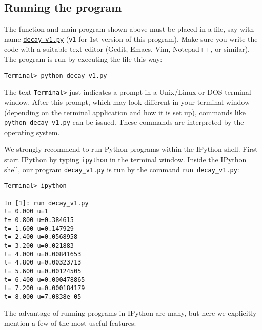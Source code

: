 \documentclass[graybox,sectrefs,envcountresetchap,open=right,final]{svmonodo}
\begin{document}
\subsection{Running the program}

The function and main program shown above must be placed in a file,
say with name \href{{http://tinyurl.com/ofkw6kc/alg/decay_v1.py}}{\nolinkurl{decay_v1.py}} (\texttt{v1} for 1st version of this program).  Make sure you
write the code with a suitable text editor (Gedit, Emacs, Vim,
Notepad++, or similar).  The program is run by executing the file this
way:



\begin{Verbatim}[frame=lines,label=\fbox{{\tiny Terminal}},framesep=2.5mm,framerule=0.7pt,fontsize=\fontsize{9pt}{9pt}]
Terminal> python decay_v1.py

\end{Verbatim}

The text \texttt{Terminal>} just indicates a prompt in a
Unix/Linux or DOS terminal window. After this prompt, which may look
different in your terminal window (depending on the terminal application
and how it is set up), commands like \Verb!python decay_v1.py! can be issued.
These commands are interpreted by the operating system.

We strongly recommend to run Python programs within the IPython shell.
First start IPython by typing \texttt{ipython} in the terminal window.
Inside the IPython shell, our program \Verb!decay_v1.py! is run by the command
\Verb!run decay_v1.py!:
















\begin{Verbatim}[frame=lines,label=\fbox{{\tiny Terminal}},framesep=2.5mm,framerule=0.7pt,fontsize=\fontsize{9pt}{9pt}]
Terminal> ipython

In [1]: run decay_v1.py
t= 0.000 u=1
t= 0.800 u=0.384615
t= 1.600 u=0.147929
t= 2.400 u=0.0568958
t= 3.200 u=0.021883
t= 4.000 u=0.00841653
t= 4.800 u=0.00323713
t= 5.600 u=0.00124505
t= 6.400 u=0.000478865
t= 7.200 u=0.000184179
t= 8.000 u=7.0838e-05

\end{Verbatim}


The advantage of running programs in IPython are many, but here
we explicitly mention a few of the most
useful features:
\end{document}
